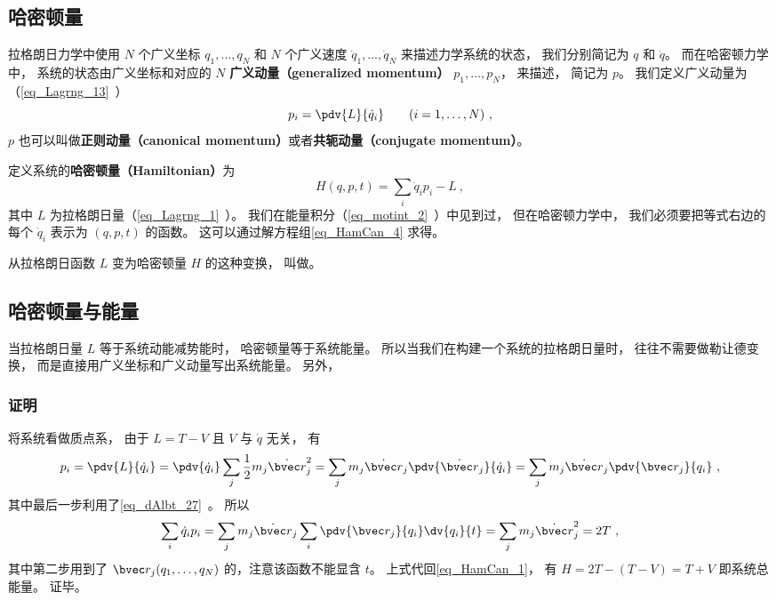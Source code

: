 

\subsection{哈密顿量}
拉格朗日力学中使用 $N$ 个广义坐标 $q_1,\dots,q_N$ 和 $N$ 个广义速度 $\dot q_1,\dots,\dot q_N$ 来描述力学系统的状态， 我们分别简记为 $q$ 和 $\dot q$。 而在哈密顿力学中， 系统的状态由广义坐标和对应的 $N$ \textbf{广义动量（generalized momentum）} $p_1, \dots, p_N$， 来描述， 简记为 $p$。 我们定义广义动量为（\autoref{eq_Lagrng_13}~）
\begin{equation}\label{eq_HamCan_4}
p_i = \pdv{L}{\dot q_i} \qquad (i = 1,\dots,N)~,
\end{equation}
$p$ 也可以叫做\textbf{正则动量（canonical momentum）}或者\textbf{共轭动量（conjugate momentum）}。

定义系统的\textbf{哈密顿量（Hamiltonian）}为
\begin{equation}\label{eq_HamCan_1}
H(q,p,t) = \sum_i \dot q_i p_i - L~,
\end{equation}
其中 $L$ 为拉格朗日量（\autoref{eq_Lagrng_1}~）。 我们在能量积分（\autoref{eq_motint_2}~）中见到过， 但在哈密顿力学中， 我们必须要把等式右边的每个 $\dot q_i$ 表示为 $(q,p,t)$ 的函数。 这可以通过解方程组\autoref{eq_HamCan_4} 求得。

从拉格朗日函数 $L$ 变为哈密顿量 $H$ 的这种变换， 叫做。

\subsection{哈密顿量与能量}
当拉格朗日量 $L$ 等于系统动能减势能时， 哈密顿量等于系统能量。 所以当我们在构建一个系统的拉格朗日量时， 往往不需要做勒让德变换， 而是直接用广义坐标和广义动量写出系统能量。 另外， 

\subsubsection{证明}
将系统看做质点系， 由于 $L = T - V$ 且 $V$ 与 $\dot q$ 无关， 有
\begin{equation}\label{eq_HamCan_6}
p_i = \pdv{L}{\dot q_i} = \pdv{\dot q_i} \sum_j \frac12 m_j \dot{\bvec r}_j^2
= \sum_j m_j \dot{\bvec r}_j \pdv{\dot{\bvec r}_j}{\dot q_i}
= \sum_j m_j \dot{\bvec r}_j  \pdv{\bvec r_j}{q_i}~,
\end{equation}
其中最后一步利用了\autoref{eq_dAlbt_27}~。 所以
\begin{equation}
 \sum_i \dot q_i p_i = \sum_j m_j \dot{\bvec r}_j \sum_i \pdv{\bvec r_j}{q_i}\dv{q_i}{t}
= \sum_j m_j \dot{\bvec r}_j^2 = 2T~,
\end{equation}
其中第二步用到了 $\bvec r_j(q_1,\dots,q_N)$ 的，注意该函数不能显含 $t$。 上式代回\autoref{eq_HamCan_1}， 有 $H = 2T - (T - V) = T + V$ 即系统总能量。 证毕。

